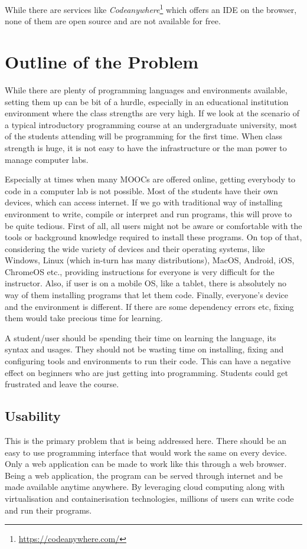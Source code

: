 \documentclass[DD]{iitmdiss}
\begin{document}
While there are services like \textit{Codeanywhere}\footnote{\url{https://codeanywhere.com/}} which offers an IDE on the browser, none of them are open source and are not available for free.

\section{Outline of the Problem}

While there are plenty of programming languages and environments available, setting them up can be bit of a hurdle, especially in an educational institution environment where the class strengths are very high. If we look at the scenario of a typical introductory programming course at an undergraduate university, most of the students attending will be programming for the first time. When class strength is huge, it is not easy to have the infrastructure or the man power to manage computer labs. 

Especially at times when many MOOCs are offered online, getting everybody to code in a computer lab is not possible. Most of the students have their own devices, which can access internet. If we go with traditional way of installing environment to write, compile or interpret and run programs, this will prove to be quite tedious. First of all, all users might not be aware or comfortable with the tools or background knowledge required to install these programs. On top of that, considering the wide variety of devices and their operating systems, like Windows, Linux (which in-turn has many distributions), MacOS, Android, iOS, ChromeOS etc., providing instructions for everyone is very difficult for the instructor. Also, if user is on a mobile OS, like a tablet, there is absolutely no way of them installing programs that let them code. Finally, everyone's device and the environment is different. If there are some dependency errors etc, fixing them would take precious time for learning.

A student/user should be spending their time on learning the language, its syntax and usages. They should not be wasting time on installing, fixing and configuring tools and environments to run their code. This can have a negative effect on beginners who are just getting into programming. Students could get frustrated and leave the course.

\subsection{Usability}
This is the primary problem that is being addressed here. There should be an easy to use programming interface that would work the same on every device. Only a web application can be made to work like this through a web browser. Being a web application, the program can be served through internet and be made available anytime anywhere. By leveraging cloud computing along with virtualisation and containerisation technologies, millions of users can write code and run their programs.
\end{document}
